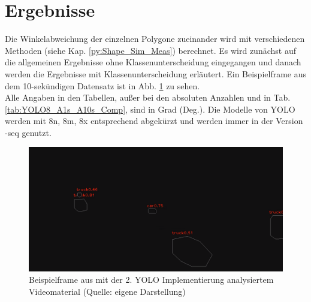 \section{Ergebnisse\label{sec:Ergebnisse}}  
{Die Winkelabweichung der einzelnen Polygone zueinander wird mit verschiedenen Methoden  (siehe Kap. \ref{py:Shape_Sim_Meas}) berechnet. Es wird zunächst auf die allgemeinen Ergebnisse ohne Klassenunterscheidung eingegangen und danach werden die Ergebnisse mit Klassenunterscheidung erläutert. Ein Beispielframe aus dem 10-sekündigen Datensatz ist in Abb. \ref{Bsp_ErgebRVA10s_Vidmat} zu sehen.\\
Alle Angaben in den Tabellen, außer bei den absoluten Anzahlen und in Tab. \ref{tab:YOLO8_A1s_A10s_Comp}, sind in Grad (Deg.). Die Modelle von YOLO werden mit 8n, 8m, 8x entsprechend abgekürzt und werden immer in der Version \glqq -seq\grqq{} genutzt.}
\begin{figure}[ht]
	\centering
	\includegraphics*[scale = 0.35, keepaspectratio ]{images/Evaluation/Screenshot_A10s_RV.png}
	\caption[Beispielframe aus mit der direkten YOLO Anwendung analysiertem Videomaterial]{Beispielframe aus mit der 2. YOLO Implementierung analysiertem Videomaterial (Quelle: eigene Darstellung)} 
	\label{Bsp_ErgebRVA10s_Vidmat}
\end{figure}
